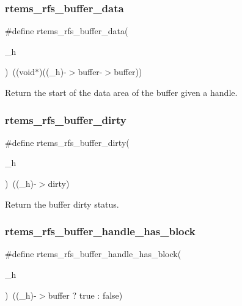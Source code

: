\subsubsection{\texorpdfstring{rtems\_rfs\_buffer\_data}{rtems\_rfs\_buffer\_data}}
{\footnotesize\ttfamily \#define rtems\+\_\+rfs\+\_\+buffer\+\_\+data(\begin{DoxyParamCaption}\item[{}]{\+\_\+h }\end{DoxyParamCaption})~((void$\ast$)((\+\_\+h)-\/$>$buffer-\/$>$buffer))}

Return the start of the data area of the buffer given a handle. \mbox{\label{rtems-rfs-buffer_8h_a89510f87db8455d566eceb93e73141ae}} 
\subsubsection{\texorpdfstring{rtems\_rfs\_buffer\_dirty}{rtems\_rfs\_buffer\_dirty}}
{\footnotesize\ttfamily \#define rtems\+\_\+rfs\+\_\+buffer\+\_\+dirty(\begin{DoxyParamCaption}\item[{}]{\+\_\+h }\end{DoxyParamCaption})~((\+\_\+h)-\/$>$dirty)}

Return the buffer dirty status. \mbox{\label{rtems-rfs-buffer_8h_a5ed1947b948ae286c8f7010bba2587e1}} 
\subsubsection{\texorpdfstring{rtems\_rfs\_buffer\_handle\_has\_block}{rtems\_rfs\_buffer\_handle\_has\_block}}
{\footnotesize\ttfamily \#define rtems\+\_\+rfs\+\_\+buffer\+\_\+handle\+\_\+has\+\_\+block(\begin{DoxyParamCaption}\item[{}]{\+\_\+h }\end{DoxyParamCaption})~((\+\_\+h)-\/$>$buffer ? true \+: false)}

